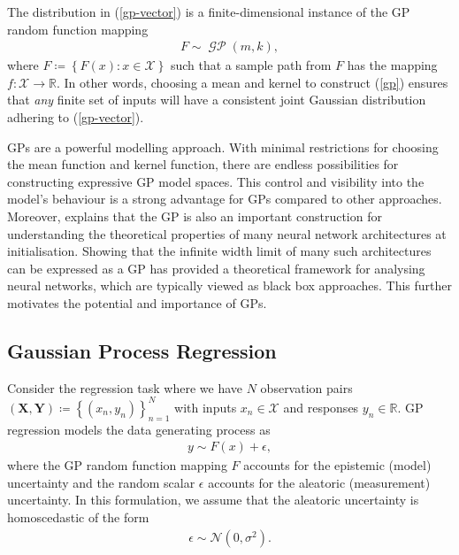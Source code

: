 \documentclass{article}
\newcommand{\GP}{\operatorname{\mathcal{GP}}}
\numberwithin{equation}{section}
\begin{document}
The distribution in (\ref{gp-vector}) is a finite-dimensional instance of the GP random function mapping
\begin{align}
    F \sim \GP(m, k),
    \label{gp}
\end{align}
 where $F \coloneqq \left\{F(x): x \in \mathcal{X}\right\}$ such that a sample path from $F$ has the mapping $f: \mathcal{X} \rightarrow \mathbb{R}$.
In other words, choosing a mean and kernel to construct (\ref{gp}) ensures that \textit{any} finite set of inputs will have a consistent joint Gaussian distribution adhering to (\ref{gp-vector}).

GPs are a powerful modelling approach. With minimal restrictions for choosing the mean function and kernel function, there are endless possibilities for constructing expressive GP model spaces.
This control and visibility into the model's behaviour is a strong advantage for GPs compared to other approaches.
Moreover, \cite{novak2019neural} explains that the GP is also an important construction for understanding the theoretical properties of many neural network architectures at initialisation.
Showing that the infinite width limit of many such architectures can be expressed as a GP has provided a theoretical framework for analysing neural networks, which are typically viewed as black box approaches.
This further motivates the potential and importance of GPs.

\subsection{Gaussian Process Regression}
Consider the regression task where we have $N$ observation pairs $(\mathbf{X}, \mathbf{Y}) \coloneqq \left\{(x_n, y_n)\right\}_{n=1}^{N}$ with inputs $x_n \in \mathcal{X}$ and responses $y_n \in \mathbb{R}$. GP regression models the data generating process as
\begin{align}
    y \sim F(x) + \epsilon,
    \label{regression-data-uncertainties}
\end{align}
where the GP random function mapping $F$ accounts for the epistemic (model) uncertainty and the random scalar $\epsilon$ accounts for the aleatoric (measurement) uncertainty. In this formulation, we assume that the aleatoric uncertainty is homoscedastic of the form
\begin{align}
    \epsilon \sim \mathcal{N} \left(0, \sigma^2\right).
    \label{aleotric-uncertainty}
\end{align}
\end{document}
